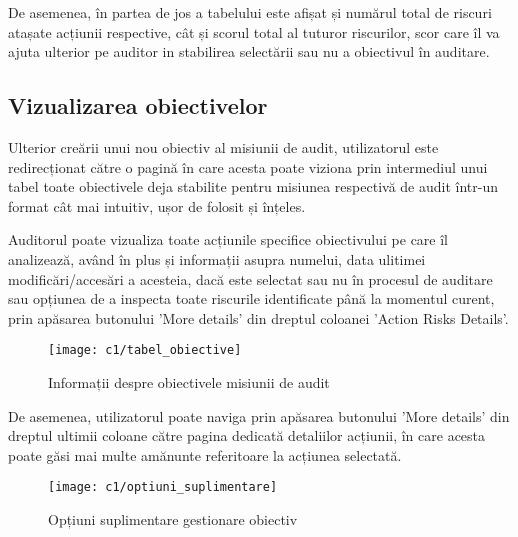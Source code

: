 De asemenea, în partea de jos a tabelului este afișat și numărul total de riscuri atașate acțiunii respective, cât și scorul total al tuturor riscurilor, scor care îl va ajuta ulterior pe auditor in stabilirea selectării sau nu a obiectivul în auditare.

\subsection{Vizualizarea obiectivelor}

Ulterior creării unui nou obiectiv al misiunii de audit, utilizatorul este redirecționat către o pagină în care acesta poate viziona prin intermediul unui tabel toate obiectivele deja stabilite pentru misiunea respectivă de audit într-un format cât mai intuitiv, ușor de folosit și înțeles.

Auditorul poate vizualiza toate acțiunile specifice obiectivului pe care îl analizează, având în plus și informații asupra numelui, data ulitimei modificări/accesări a acesteia, dacă este selectat sau nu în procesul de auditare sau opțiunea de a inspecta toate riscurile identificate până la momentul curent, prin apăsarea butonului 'More details' din dreptul coloanei 'Action Risks Details'.

\vspace{1cm}
\begin{figure}[h]
	\centering
	
	\texttt{[image: c1/tabel\_obiective]}
	\caption{Informații despre obiectivele misiunii de audit}
\end{figure}



De asemenea, utilizatorul poate naviga prin apăsarea butonului 'More details' din dreptul ultimii coloane către pagina dedicată detaliilor acțiunii, în care acesta poate găsi mai multe amănunte referitoare la acțiunea selectată.


\vspace{1cm}
\begin{figure}[h]
	\centering
	
	\texttt{[image: c1/optiuni\_suplimentare]}
	\caption{Opțiuni suplimentare gestionare obiectiv}
\end{figure}


